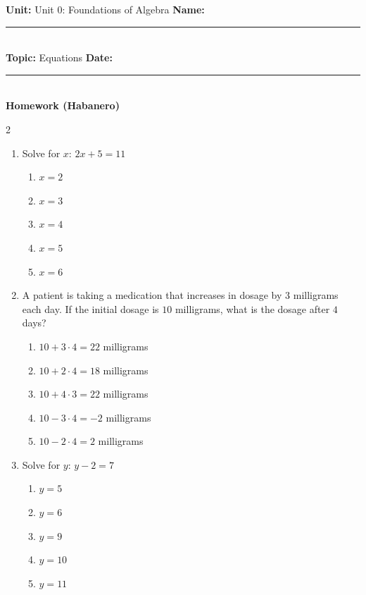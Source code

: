 \documentclass[10pt]{article}
\begin{document}
\enlargethispage{2.5cm}

\begin{tcolorbox}[colback=mainblue!5, colframe=mainblue, sharp corners, boxrule=0.5pt]
    \small \textbf{Unit:} Unit 0: Foundations of Algebra \hfill \textbf{Name:} \rule{3cm}{0.4pt} \\
    \small \textbf{Topic:} Equations \hfill \textbf{Date:} \rule{2cm}{0.4pt} \\
    \centering \textbf{\large Homework (Habanero)}
\end{tcolorbox}

\vspace{0.2cm}

\begin{multicols}{2}
\begin{enumerate}[label=\textbf{Q\arabic*.}, leftmargin=*, itemsep=6pt, parsep=0pt]

  \item \small Solve for $x$: $2x + 5 = 11$
  \begin{enumerate}[label=(\Alph*), leftmargin=0.6cm, nosep, itemsep=2pt]
    \item $x = 2$
    \item $x = 3$
    \item $x = 4$
    \item $x = 5$
    \item $x = 6$
  \end{enumerate}

  \item \small A patient is taking a medication that increases in dosage by $3$ milligrams each day. If the initial dosage is $10$ milligrams, what is the dosage after $4$ days?
  \begin{enumerate}[label=(\Alph*), leftmargin=0.6cm, nosep, itemsep=2pt]
    \item $10 + 3 \cdot 4 = 22$ milligrams
    \item $10 + 2 \cdot 4 = 18$ milligrams
    \item $10 + 4 \cdot 3 = 22$ milligrams
    \item $10 - 3 \cdot 4 = -2$ milligrams
    \item $10 - 2 \cdot 4 = 2$ milligrams
  \end{enumerate}

  \item \small Solve for $y$: $y - 2 = 7$
  \begin{enumerate}[label=(\Alph*), leftmargin=0.6cm, nosep, itemsep=2pt]
    \item $y = 5$
    \item $y = 6$
    \item $y = 9$
    \item $y = 10$
    \item $y = 11$
  \end{enumerate}


\end{enumerate}
\end{multicols}
\end{document}
